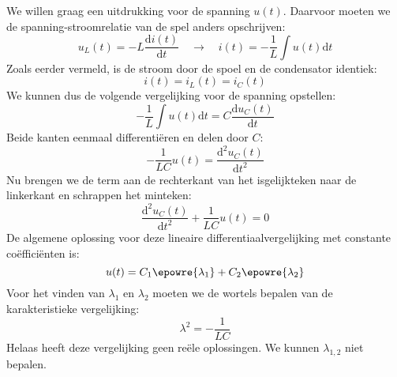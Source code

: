 We willen graag een uitdrukking voor de spanning $u(t)$. Daarvoor moeten we de spanning-stroomrelatie van de spel anders opschrijven:
%
\begin{equation}
u_L(t) = -L\dfrac{\mathrm{d}i(t)}{\mathrm{d}t} \quad\longrightarrow\quad i(t) = -\dfrac{1}{L}\int u(t) \mathrm{d}t
\end{equation}
%
Zoals eerder vermeld, is de stroom door de spoel en de condensator identiek:
%
\begin{equation}
i(t) = i_L(t) = i_C(t)
\end{equation}
%
We kunnen dus de volgende vergelijking voor de spanning opstellen:
%
\begin{equation}
-\dfrac{1}{L}\int u(t) \mathrm{d}t = C\dfrac{\mathrm{d}u_C(t)}{\mathrm{d}t}
\end{equation}
%
Beide kanten eenmaal differentiëren en delen door $C$:
%
\begin{equation}
-\dfrac{1}{LC}u(t) =\dfrac{\mathrm{d}^2u_C(t)}{\mathrm{d}t^2}
\end{equation}
%
Nu brengen we de term aan de rechterkant van het isgelijkteken naar de linkerkant en schrappen het minteken:
%
\begin{equation}
\dfrac{\mathrm{d}^2u_C(t)}{\mathrm{d}t^2} + \dfrac{1}{LC}u(t) = 0
\end{equation}
%
De algemene oplossing voor deze lineaire differentiaalvergelijking met constante coëfficiënten is:
%
\begin{equation}
u(t) = C_1\epowre{\lambda_1} + C_2\epowre{\lambda_2}
\end{equation}
%
Voor het vinden van $\lambda_1$ en $\lambda_2$ moeten we de wortels bepalen van de karakteristieke vergelijking:
%
\begin{equation}
\lambda^2 = -\dfrac{1}{LC}
\end{equation}
%
Helaas heeft deze vergelijking geen reële oplossingen. We kunnen $\lambda_{1,2}$ niet bepalen.

%
%



